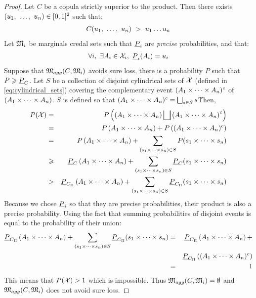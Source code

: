 \begin{proof}
    Let $C$ be a copula strictly superior to the product. Then there exists $(u_1 , ~\dots, ~ u_n)\in[0,1]^2$ such that:
    \begin{eqnarray*}
        C(u_1 , ~\dots, ~  u_n)~>~u_1\dots u_n
    \end{eqnarray*}
    Let $\mathfrak{M}_i$ be marginals credal sets such that $\underline{P}_i$ are \textit{precise} probabilities, and that:
    \begin{eqnarray*}
        \forall i,~\exists A_i\in\mathcal{X}_i,~\underline{P}_i(A_i)=u_i
    \end{eqnarray*}
    Suppose that $\mathfrak{M}_{agg}(C, \mathfrak{M}_i)$ avoids sure loss, \ie there is a probability $P$ such that $P\geqslant\underline{P}_C$. Let $S$ be a collection of disjoint cylindrical sets of $\mathcal{X}$ (defined in \cref{eq:cylindrical_sets}) covering the complementary event $(A_1\times\dots\times A_n)^c$ of $(A_1\times\dots\times A_n)$. $S$ is defined so that $(A_1\times\dots\times A_n)^c=\bigsqcup_{s\in S}s$\.
    Then,
    \begin{eqnarray*}
        P(\mathcal{X}) &=& P\left(\left(A_1\times\dots\times A_n\right)\bigsqcup\left(A_1\times\dots\times A_n\right)^c\right)\\
        &=& P\left(A_1\times\dots\times A_n\right)+P\left((A_1\times\dots\times A_n)^c\right)\\
        &=& P\left(A_1\times\dots\times A_n\right)+\sum_{(s_1\times\dots\times s_n)\in S}P(s_1\times\dots\times s_n)\\
        &\geqslant& \underline{P}_C\left(A_1\times\dots\times A_n\right)+\sum_{(s_1\times\dots\times s_n)\in S}\underline{P}_C(s_1\times\dots\times s_n)\\
        &>& \underline{P}_{C_\Pi}\left(A_1\times\dots\times A_n\right)+\sum_{(s_1\times\dots\times s_n)\in S}\underline{P}_{C_\Pi}(s_1\times\dots\times s_n)
    \end{eqnarray*}
    Because we chose $\underline{P}_i$ so that they are precise probabilities, their product is also a precise probability. Using the fact that summing probabilities of disjoint events is equal to the probability of their union:
    \begin{eqnarray*}
        \underline{P}_{C_\Pi}\left(A_1\times\dots\times A_n\right)+\sum_{(s_1\times\dots\times s_n)\in S}\underline{P}_{C_\Pi}(s_1\times\dots\times s_n) &=& \underline{P}_{C_\Pi}\left(A_1\times\dots\times A_n\right)+\\
        &&\underline{P}_{C_\Pi}\left((A_1\times\dots\times A_n)^c\right)\\
        &=& 1
    \end{eqnarray*}
    This means that $P(\mathcal{X})>1$ which is impossible. Thus $\mathfrak{M}_{agg}(C, \mathfrak{M}_i)=\emptyset$ and $\mathfrak{M}_{agg}(C, \mathfrak{M}_i)$ does not avoid sure loss.
\end{proof}


